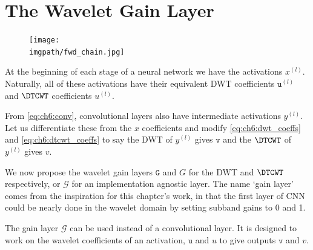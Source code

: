 \section{The Wavelet Gain Layer}

\begin{figure}[t]
  \centering
  \texttt{[image: \\imgpath/fwd\_chain.jpg]}
  \label{fig:ch6:fwd_chain}
\end{figure}

At the beginning of each stage of a neural network we have the activations
$x^{(l)}$. Naturally, all of these activations have their equivalent DWT 
coefficients $\mathtt{u}^{(l)}$ and $\DTCWT$ coefficients $u^{(l)}$. 

From \eqref{eq:ch6:conv}, convolutional layers also have intermediate
activations $y^{(l)}$. Let us differentiate these from the $x$ coefficients and
modify \eqref{eq:ch6:dwt_coeffs} and \eqref{eq:ch6:dtcwt_coeffs} to say the DWT
of $y^{(l)}$ gives $\mathtt{v}$ and the $\DTCWT$ of $y^{(l)}$ gives $v$.

We now propose the wavelet gain layers $\mathtt{G}$ and $G$ for the DWT and
$\DTCWT$ respectively, or $\mathcal{G}$ for an implementation agnostic layer.
The name `gain layer' comes from the inspiration for this chapter's work, in
that the first layer of CNN could be nearly done in the wavelet domain by
setting subband gains to 0 and 1. 

The gain layer $\mathcal{G}$ can be used instead of a convolutional layer. 
It is designed to work on the wavelet coefficients of an activation,
$\mathtt{u}$ and $u$ to give outputs $\mathtt{v}$ and $v$. 

